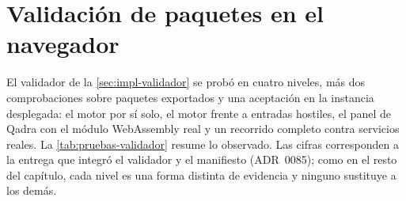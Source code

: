 
\section{Validación de paquetes en el navegador}\label{sec:pruebas-validador}

El validador de la \cref{sec:impl-validador} se probó en cuatro niveles, más dos comprobaciones sobre paquetes exportados y una aceptación en la instancia desplegada: el motor por sí solo, el motor frente a entradas hostiles, el panel de Qadra con el módulo WebAssembly real y un recorrido completo contra servicios reales. La \cref{tab:pruebas-validador} resume lo observado. Las cifras corresponden a la entrega que integró el validador y el manifiesto (ADR~0085); como en el resto del capítulo, cada nivel es una forma distinta de evidencia y ninguno sustituye a los demás.

